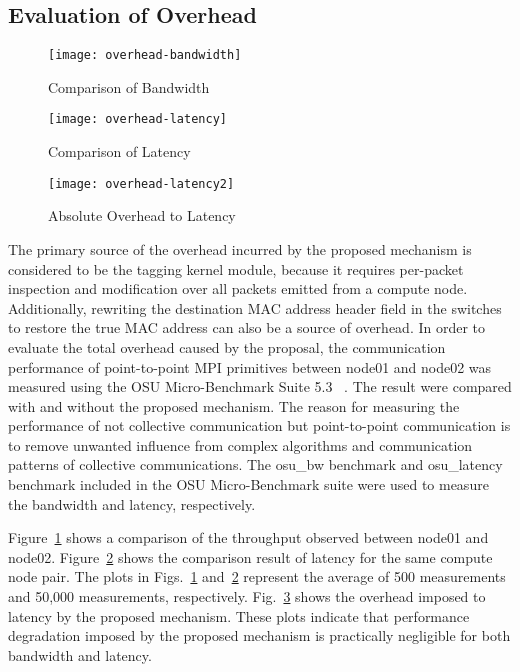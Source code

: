 \subsection{Evaluation of Overhead}

\begin{figure}
    \centering
    \texttt{[image: overhead-bandwidth]}
    \caption{Comparison of Bandwidth}%
    \label{fig:overhead-bandwidth}
\end{figure}

\begin{figure}
    \centering
    \texttt{[image: overhead-latency]}
    \caption{Comparison of Latency}%
    \label{fig:overhead-latency}
\end{figure}

\begin{figure}
    \centering
    \texttt{[image: overhead-latency2]}
    \caption{Absolute Overhead to Latency}
    \label{fig:overhead-latency-2}
\end{figure}

The primary source of the overhead incurred by the proposed mechanism is
considered to be the tagging kernel module, because it requires
per-packet inspection and modification over all packets emitted from a
compute node. Additionally, rewriting the destination MAC address
header field in the switches to restore the true MAC address can also be
a source of overhead. In order to evaluate the total overhead caused by
the proposal, the communication performance of point-to-point MPI primitives
between node01 and node02 was measured using the OSU Micro-Benchmark Suite
5.3~\autocite{omb} . The result were compared  with and without the proposed
mechanism. The reason for measuring the performance of not collective
communication but point-to-point communication is to remove unwanted influence
from complex algorithms and communication patterns of collective
communications. The osu\_bw benchmark and osu\_latency benchmark included in
the OSU Micro-Benchmark suite were used to measure the bandwidth and latency,
respectively.

Figure~\ref{fig:overhead-bandwidth} shows a comparison of the throughput
observed between node01 and node02. Figure~\ref{fig:overhead-latency} shows
the comparison result of latency for the same compute node pair. The plots in
Figs.~\ref{fig:overhead-bandwidth} and~\ref{fig:overhead-latency} represent
the average of 500 measurements and 50,000 measurements, respectively.
Fig.~\ref{fig:overhead-latency-2} shows the overhead imposed to latency by the
proposed mechanism. These plots indicate that performance degradation imposed
by the proposed mechanism is practically negligible for both bandwidth and
latency.

